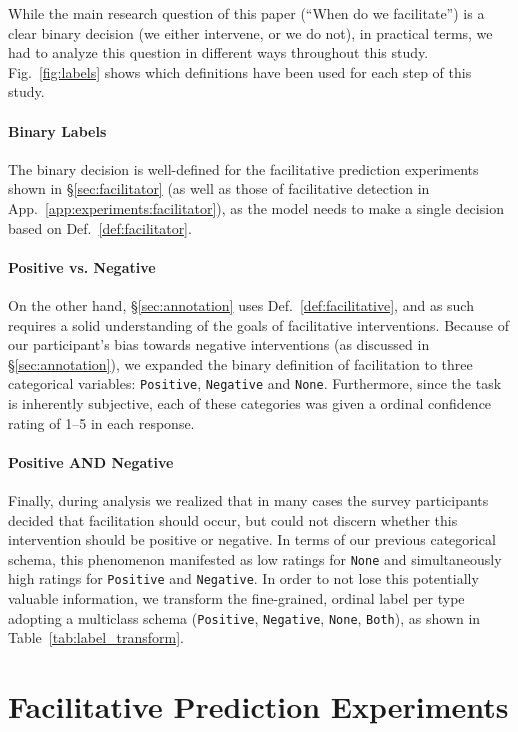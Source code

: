\documentclass[11pt]{article}
\theoremstyle{definition}
\theoremstyle{plain}
\begin{document}
While the main research question of this paper (``When do we facilitate'') is a clear binary decision (we either intervene, or we do not), in practical terms, we had to analyze this question in different ways throughout this study. Fig.~\ref{fig:labels} shows which definitions have been used for each step of this study.

\paragraph{Binary Labels} The binary decision is well-defined for the facilitative prediction experiments shown in \S\ref{sec:facilitator} (as well as those of facilitative detection in App.~\ref{app:experiments:facilitator}), as the model needs to make a single decision based on Def.~\ref{def:facilitator}. 

\paragraph{Positive vs. Negative} On the other hand, \S\ref{sec:annotation} uses Def.~\ref{def:facilitative}, and as such requires a solid understanding of the goals of facilitative interventions. Because of our participant's bias towards negative interventions (as discussed in \S\ref{sec:annotation}), we expanded the binary definition of facilitation to three categorical variables: \texttt{Positive}, \texttt{Negative} and \texttt{None}. Furthermore, since the task is inherently subjective, each of these categories was given a ordinal confidence rating of 1--5 in each response. 

\paragraph{Positive AND Negative} Finally, during analysis we realized that in many cases the survey participants decided that facilitation should occur, but could not discern whether this intervention should be positive or negative. In terms of our previous categorical schema, this phenomenon manifested as low ratings for \texttt{None} and simultaneously high ratings for \texttt{Positive} and \texttt{Negative}. In order to not lose this potentially valuable information, we transform the fine-grained, ordinal label per type adopting a multiclass schema (\texttt{Positive}, \texttt{Negative}, \texttt{None}, \texttt{Both}), as shown in Table~\ref{tab:label_transform}.


\section{Facilitative Prediction Experiments}
\label{app:experiments}
\end{document}
